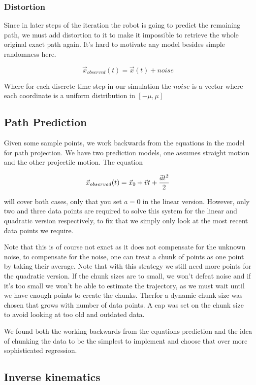 \documentclass[letterpaper, 10 pt, conference]{ieeeconf}  %
\begin{document}
\subsubsection{Distortion}

Since in later steps of the iteration the robot is going to predict the
remaining path, we must add distortion to it to make it impossible to
retrieve the whole original exact path again. It's hard to motivate
any model besides simple randomness here.

\[
  \vec{x}_{observed}(t) = \vec{x}(t) + noise
\]

Where for each discrete time step in our simulation the $noise$ is a vector
where each coordinate is a uniform distribution in $[-\mu, \mu]$

\subsection{Path Prediction}

Given some sample points, we work backwards from the equations in the
model for path projection.  We have two prediction models, one assumes
straight motion and the other projectile motion.  The equation

\[
  \vec{x}_{observed}(t) = \vec{x}_0 + \vec{v}t + {\vec{a}t^2 \over 2}
\]

will cover both cases, only that you set $a=0$ in the linear version.
However, only two and three data points are required to solve this
system for the linear and quadratic version respectively, to fix that we
simply only look at the most recent data points we require.

Note that this is of course not exact as  it does not compensate for the
unknown noise, to compensate for the noise, one can treat a chunk of
points  as one point by taking their average. Note that with this
strategy we still need more points for the quadratic version. If the
chunk sizes are to small, we won't defeat noise and if it's too small we
won't be able to estimate the trajectory, as we must wait until we have
enough points to create the chunks. Therfor a dynamic chunk size was
chosen that grows with number of data points. A cap was set on the chunk
size to avoid looking at too old and outdated data.

We found both the working backwards from the equations prediction and
the idea of chunking the data to be the simplest to implement and choose
that over more sophisticated regression.

\subsection{Inverse kinematics}
\end{document}
